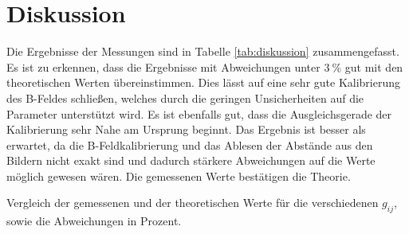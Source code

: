 
\section{Diskussion}
\label{sec:Diskussion}

Die Ergebnisse der Messungen sind in Tabelle \ref{tab:diskussion} zusammengefasst. Es ist zu erkennen, dass die Ergebnisse mit Abweichungen unter $\SI{3}{\%}$ gut mit den theoretischen Werten übereinstimmen. Dies lässt auf eine sehr gute Kalibrierung des B-Feldes schließen, welches durch die geringen Unsicherheiten auf die Parameter unterstützt wird. Es ist ebenfalls gut, dass die Ausgleichsgerade der Kalibrierung sehr Nahe am Ursprung beginnt. Das Ergebnis ist besser als erwartet, da die B-Feldkalibrierung und das Ablesen der Abstände aus den Bildern nicht exakt sind und dadurch stärkere Abweichungen auf die Werte möglich gewesen wären. Die gemessenen Werte bestätigen die Theorie. 

\begin{table}
	\centering
	\caption{Vergleich der gemessenen und der theoretischen Werte für die verschiedenen $g_{ij}$, sowie die Abweichungen in Prozent.}
	
	\label{tab:diskussion}
\end{table}
